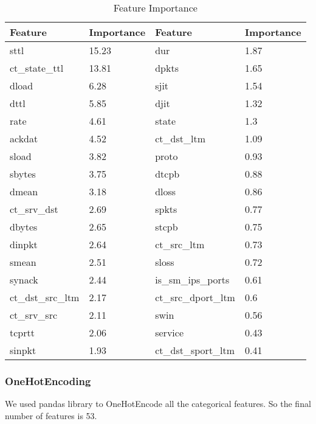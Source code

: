 \documentclass[14pt, conference]{IEEEtran}
\begin{document}
\begin{table}
\normalsize
\centering
\caption{Feature Importance}
\label{featureImportance}
\renewcommand{\arraystretch}{1.2}
\begin{tabular}{|C{2.2cm}|C{1.2cm}|C{2.5cm}|C{1.2cm}|}
\hline
\textbf{Feature} & \textbf{Importance} & \textbf{Feature} & \textbf{Importance}\\ \hline

sttl & 15.23& dur & 1.87  \\ \hline
ct\_state\_ttl & 13.81& dpkts & 1.65  \\ \hline
dload & 6.28& sjit & 1.54  \\ \hline
dttl & 5.85& djit & 1.32  \\ \hline
rate & 4.61& state & 1.3  \\ \hline
ackdat & 4.52& ct\_dst\_ltm & 1.09  \\ \hline
sload & 3.82& proto & 0.93  \\ \hline
sbytes & 3.75& dtcpb & 0.88  \\ \hline
dmean & 3.18& dloss & 0.86  \\ \hline
ct\_srv\_dst & 2.69& spkts & 0.77  \\ \hline
dbytes & 2.65& stcpb & 0.75  \\ \hline
dinpkt & 2.64& ct\_src\_ltm & 0.73  \\ \hline
smean & 2.51& sloss & 0.72  \\ \hline
synack & 2.44& is\_sm\_ips\_ports & 0.61  \\ \hline
ct\_dst\_src\_ltm & 2.17& ct\_src\_dport\_ltm & 0.6  \\ \hline
ct\_srv\_src & 2.11& swin & 0.56  \\ \hline
tcprtt & 2.06& service & 0.43  \\ \hline
sinpkt & 1.93& ct\_dst\_sport\_ltm & 0.41  \\ \hline

\end{tabular}
\end{table}


\subsubsection{OneHotEncoding}
We used pandas library to OneHotEncode all the categorical features. So the final number of features is 53.
\end{document}
